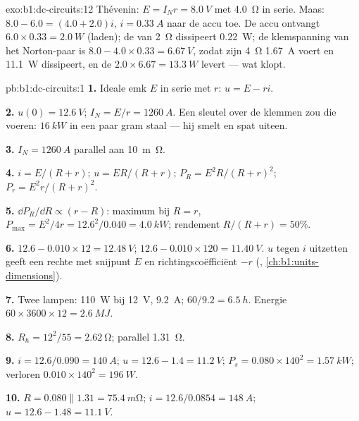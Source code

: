 \begin{solution}{exo:b1:dc-circuits:12}
Thévenin: $E = I_N r = \qty{8.0}{V}$ met \qty{4.0}{\ohm} in serie.
Maas: $8.0 - 6.0 = (4.0 + 2.0)i$, $i = \qty{0.33}{A}$ naar de accu toe.
De accu ontvangt $6.0 \times 0.33 = \qty{2.0}{W}$ (laden); de
 van \qty{2}{\ohm} dissipeert \qty{0.22}{W}; de klemspanning van
het Norton-paar is $8.0 - 4.0 \times 0.33 = \qty{6.67}{V}$, zodat zijn
\qty{4}{\ohm} \qty{1.67}{A} voert en \qty{11.1}{W} dissipeert, en de
 $2.0 \times 6.67 = \qty{13.3}{W}$ levert --- wat
klopt.
\end{solution}

\begin{solution}{pb:b1:dc-circuits:1}
\textbf{1.} Ideale emk $E$ in serie met $r$: $u = E - ri$.

\textbf{2.} $u(0) = \qty{12.6}{V}$; $I_N = E/r = \qty{1260}{A}$. Een sleutel
over de klemmen zou die voeren: $\qty{16}{kW}$ in een paar gram
staal --- hij smelt en spat uiteen.

\textbf{3.}  $I_N = \qty{1260}{A}$ parallel aan
\qty{10}{m\ohm}.

\textbf{4.} $i = E/(R + r)$; $u = ER/(R + r)$; $P_R = E^2R/(R + r)^2$;
$P_r = E^2r/(R + r)^2$.

\textbf{5.} $\dd P_R/\dd R \propto (r - R)$: maximum bij $R = r$,
$P_{\max} = E^2/4r = 12.6^2/0.040 = \qty{4.0}{kW}$; rendement
$R/(R + r) = 50\%$.

\textbf{6.} $12.6 - 0.010 \times 12 = \qty{12.48}{V}$; $12.6 - 0.010 \times
120 = \qty{11.40}{V}$. $u$ tegen $i$ uitzetten geeft een rechte met
snijpunt $E$ en richtingscoëfficiënt $-r$ (, \cref{ch:b1:units-dimensions}).

\textbf{7.} Twee lampen: \qty{110}{W} bij \qty{12}{V}, \qty{9.2}{A};
$60/9.2 = \qty{6.5}{h}$. Energie $60 \times 3600 \times 12 = \qty{2.6}{MJ}$.

\textbf{8.} $R_h = 12^2/55 = \qty{2.62}{\ohm}$; parallel \qty{1.31}{\ohm}.

\textbf{9.} $i = 12.6/0.090 = \qty{140}{A}$; $u = 12.6 - 1.4 = \qty{11.2}{V}$;
$P_s = 0.080 \times 140^2 = \qty{1.57}{kW}$; verloren $0.010 \times 140^2 =
\qty{196}{W}$.

\textbf{10.} $R = 0.080 \parallel 1.31 = \qty{75.4}{m\ohm}$; $i = 12.6/0.0854
= \qty{148}{A}$; $u = 12.6 - 1.48 = \qty{11.1}{V}$.


\end{solution}
